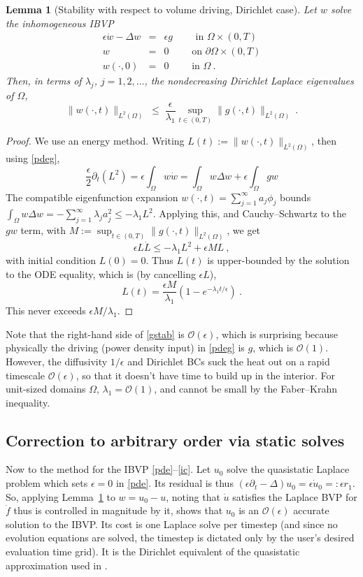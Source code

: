 \documentclass[10pt]{article}
\newcommand{\be}{\begin{equation}}
\newcommand{\ee}{\end{equation}}
\newcommand{\bea}{\begin{eqnarray}}
\newcommand{\eea}{\end{eqnarray}}
\newcommand{\bigO}{{\mathcal O}}
\newtheorem{lem}[thm]{Lemma}
\newcommand{\pO}{{\partial\Omega}}
\newcommand{\eps}{\epsilon}
\newcommand{\dt}{\partial_t}
\newcommand{\LTO}{{L^2(\Omega)}}
\begin{document}
\begin{lem}[Stability with respect to volume driving, Dirichlet case]  %
  Let $w$ solve the inhomogeneous IBVP
\bea
\eps\dot{w} - \Delta w &=& \eps g    \qquad \mbox{ in } \Omega\times (0,T)
\label{pdeg}
\\
w  &=& 0  \qquad \mbox{ on } \pO \times (0,T)
\label{bc0}
\\
w(\cdot, 0)    &=&  0 \qquad \mbox{ in } \Omega ~.
\eea
Then, in terms of $\lambda_j$, $j=1,2,\dots$,
the nondecreasing Dirichlet Laplace eigenvalues of $\Omega$,
\be
\|w(\cdot,t)\|_\LTO \;\le\;
\frac{\eps}{\lambda_1}\sup_{t\in(0,T)}\|g(\cdot,t)\|_\LTO~.
\label{gstab}
\ee
\label{l:gstab}
\end{lem}
\begin{proof}
We use an energy method.
Writing $L(t):=\|w(\cdot,t)\|_\LTO$, then using \eqref{pdeg},
\be
\frac{\eps}{2}\dt(L^2) = \eps\int_\Omega w \dot w = \int_\Omega
w\Delta w + \eps \int_\Omega g w
\label{energy}
\ee
The compatible eigenfunction expansion
$w(\cdot,t) = \sum_{j=1}^\infty a_j \phi_j$
bounds $\int_\Omega w\Delta w = -\sum_{j=1}^\infty \lambda_j a_j^2
\le -\lambda_1 L^2$.
Applying this, and Cauchy--Schwartz to the $gw$ term, with $M:=\sup_{t\in(0,T)}\|g(\cdot,t)\|_\LTO$,
we get
$$
\eps L\dot L \le -\lambda_1 L^2 + \eps ML~,
$$
with initial condition $L(0)=0$.
Thus $L(t)$ is upper-bounded by the solution to the ODE equality,
which is (by cancelling $\eps L$),
$$
L(t) = \frac{\eps M}{\lambda_1} (1 - e^{-\lambda_1 t / \eps})~.
$$
This never exceeds $\eps M/\lambda_1$.
\end{proof}

Note that the right-hand side of \eqref{gstab} is $\bigO(\eps)$,
which is surprising because physically the driving
(power density input) in \eqref{pdeg} is $g$, which is $\bigO(1)$.
However, the diffusivity $1/\eps$ and Dirichlet BCs suck
the heat out on a rapid timescale $\bigO(\eps)$, so that it doesn't have time to build up in the interior.
For unit-sized domains $\Omega$, $\lambda_1=\bigO(1)$, and cannot be
small by the Faber--Krahn inequality.


\subsection{Correction to arbitrary order via static solves}

Now to the method for the IBVP \eqref{pde}--\eqref{ic}.
Let $u_0$ solve the quasistatic Laplace problem which sets $\eps=0$
in \eqref{pde}.
Its residual is thus $(\eps\dt-\Delta)u_0 = \eps \dot u_0 =: \eps r_1$.
So, applying Lemma~\ref{l:gstab} to $w= u_0-u$,
noting that $\dot u$ satisfies the Laplace BVP for $\dot f$ thus is controlled
in magnitude by it,
shows that $u_0$ is an $\bigO(\eps)$ accurate solution
to the IBVP.
Its cost is one Laplace solve per timestep (and since no evolution
equations are solved, the timestep is dictated only by the user's desired
evaluation time grid).
It is the Dirichlet equivalent of the quasistatic approximation
used in \cite{diegmiller18}.
\end{document}
